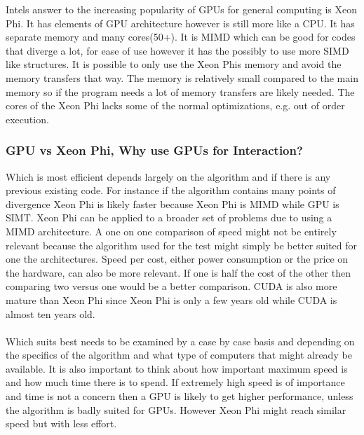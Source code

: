 \documentclass[10pt,a4paper]{report}
\begin{document}
Intels answer to the increasing popularity of GPUs for general computing is Xeon Phi\cite{jeffers2013intel}. It has elements of GPU architecture however is still more like a CPU. It has separate memory and many cores(50+)\cite{jeffers2013intel}. It is MIMD which can be good for codes that diverge a lot, for ease of use however it has the possibly to use more SIMD like structures\cite{jeffers2013intel}. It is possible to only use the Xeon Phis memory and avoid the memory transfers that way. The memory is relatively small compared to the main memory so if the program needs a lot of memory transfers are likely needed. The cores of the Xeon Phi lacks some of the normal optimizations, e.g. out of order execution\cite{jeffers2013intel}.

\subsubsection{GPU vs Xeon Phi, Why use GPUs for Interaction?}
\label{gpu_gwas}
Which is most efficient depends largely on the algorithm and if there is any previous existing code. For instance if the algorithm contains many points of divergence Xeon Phi is likely faster because Xeon Phi is MIMD while GPU is SIMT. Xeon Phi can be applied to a broader set of problems due to using a MIMD architecture\cite{jeffers2013intel}. A one on one comparison of speed might not be entirely relevant because the algorithm used for the test might simply be better suited for one the architectures. Speed per cost, either power consumption or the price on the hardware, can also be more relevant. If one is half the cost of the other then comparing two versus one would be a better comparison. CUDA is also more mature than Xeon Phi since Xeon Phi is only a few years old while CUDA is almost ten years old\cite{cuda, jeffers2013intel}.\\
\\
Which suits best needs to be examined by a case by case basis and depending on the specifics of the algorithm and what type of computers that might already be available. It is also important to think about how important maximum speed is and how much time there is to spend. If extremely high speed is of importance and time is not a concern then a GPU is likely to get higher performance, unless the algorithm is badly suited for GPUs. However Xeon Phi might reach similar speed but with less effort.\\
\\
\end{document}
